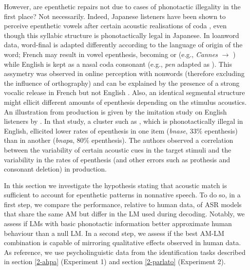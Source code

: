 However, are epenthetic repairs not due to cases of phonotactic illegality in the first place? Not necessarily. Indeed, Japanese listeners have been shown to perceive epenthetic vowels after certain acoustic realisations of coda \textipa{[n]}, even though this syllabic structure is phonotactically legal in Japanese. In loanword data, word-final \textipa{[n]} is adapted differently according to the language of origin of the word; French  may result in vowel epenthesis, becoming \textipa{[n:u]} or \textipa{[nu]} (e.g., \textit{Cannes}  $\rightarrow$ ) while English \textipa{[n]} is kept as a nasal coda consonant (e.g., \textit{pen} adapted as ). This assymetry was observed in online perception with nonwords (therefore excluding the influence of orthography) and can be explained by the presence of a strong vocalic release in French \textipa{[n]} but not English \textipa{[n]} \cite{peperkamp2008}.
Also, an identical segmental structure might ellicit different amounts of epenthesis depending on the stimulus acoustics. An illustration from production is given by the imitation study on English listeners by \cite{wilson2014}. In that study, a cluster such as , which is phonotactically illegal in English, ellicited lower rates of epenthesis in one item (\textit{bnase}, $33\%$ epenthesis) than in another (\textit{bnapa}, $80\%$ epenthesis). The authors observed a correlation between the variability of certain acoustic cues in the target stimuli and the variability in the rates of epenthesis (and other errors such as prothesis and consonant deletion) in production.

In this section we investigate the hypothesis stating that acoustic match is sufficient to account for epenthetic patterns in nonnative speech. To do so, in a first step, we compare the performance, relative to human data, of ASR models that share the same AM but differ in the LM used during decoding. Notably, we assess if LMs with basic phonotactic information better approximate human behaviour than a null LM. In a second step, we assess if the best AM-LM combination is capable of mirroring qualitative effects observed in human data.
As reference, we use psycholinguistic data from the identification tasks described in section \ref{2-ahpa} (Experiment 1) and section \ref{2-parlato} (Experiment 2). 


